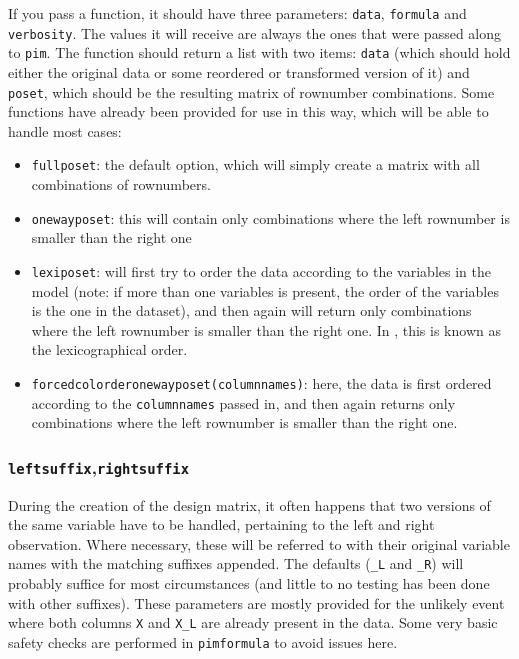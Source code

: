 \documentclass[12pt]{article}
\newcommand{\pim}[1]{\texttt{#1}}%
\newcommand{\cd}[1]{\texttt{#1}}%
\begin{document}
If you pass a function, it should have three parameters: \cd{data}, \cd{formula} and \cd{verbosity}. The values it will receive are always the ones that were passed along to \pim{pim}. The function should return a list with two items: \cd{data} (which should hold either the original data or some reordered or transformed version of it) and \cd{poset}, which should be the resulting matrix of rownumber combinations. Some functions have already been provided for use in this way, which will be able to handle most cases:
\begin{itemize}
	\item \pim{fullposet}: the default option, which will simply create a matrix with all combinations of rownumbers.
	\item \pim{onewayposet}: this will contain only combinations where the left rownumber is smaller than the right one
	\item \pim{lexiposet}: will first try to order the data according to the variables in the model (note: if more than one variables is present, the order of the variables is the one in the dataset), and then again will return only combinations where the left rownumber is smaller than the right one. In \cite{Thas2012}, this is known as the lexicographical order.
	\item \pim{forcedcolorderonewayposet}\cd{(columnnames)}: here, the data is first ordered according to the \cd{columnnames} passed in, and then again returns only combinations where the left rownumber is smaller than the right one.
\end{itemize}
\subsubsection{\cd{leftsuffix},\cd{rightsuffix}}
During the creation of the design matrix, it often happens that two versions of the same variable have to be handled, pertaining to the left and right observation. Where necessary, these will be referred to with their original variable names with the matching suffixes appended. The defaults (\cd{\_L} and \cd{\_R}) will probably suffice for most circumstances (and little to no testing has been done with other suffixes). These parameters are mostly provided for the unlikely event where both columns \cd{X} and \cd{X\_L} are already present in the data. Some very basic safety checks are performed in \pim{pimformula} to avoid issues here.
\end{document}

